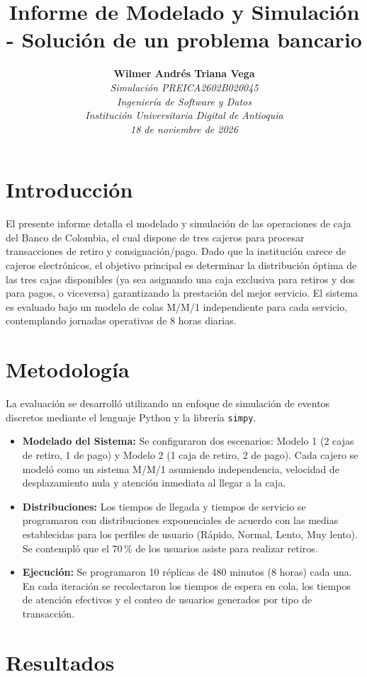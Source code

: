 \documentclass[12pt, a4paper]{article}
\title{\textbf{Informe de Modelado y Simulación - Solución de un problema bancario}}
\author{
\textbf{Wilmer Andrés Triana Vega} \\
\textit{Simulación PREICA2602B020045} \\
\textit{Ingeniería de Software y Datos} \\
\textit{Institución Universitaria Digital de Antioquia} \\
\textit{18 de noviembre de 2026}
}
\date{}
\begin{document}
\maketitle

\section{Introducción}
El presente informe detalla el modelado y simulación de las operaciones de caja del Banco de Colombia, el cual dispone de tres cajeros para procesar transacciones de retiro y consignación/pago. Dado que la institución carece de cajeros electrónicos, el objetivo principal es determinar la distribución óptima de las tres cajas disponibles (ya sea asignando una caja exclusiva para retiros y dos para pagos, o viceversa) garantizando la prestación del mejor servicio. El sistema es evaluado bajo un modelo de colas M/M/1 independiente para cada servicio, contemplando jornadas operativas de 8 horas diarias.

\section{Metodología}
La evaluación se desarrolló utilizando un enfoque de simulación de eventos discretos mediante el lenguaje Python y la librería \texttt{simpy}.

\begin{itemize}
    \item \textbf{Modelado del Sistema:} Se configuraron dos escenarios: Modelo 1 (2 cajas de retiro, 1 de pago) y Modelo 2 (1 caja de retiro, 2 de pago). Cada cajero se modeló como un sistema M/M/1 asumiendo independencia, velocidad de desplazamiento nula y atención inmediata al llegar a la caja.
    \item \textbf{Distribuciones:} Los tiempos de llegada y tiempos de servicio se programaron con distribuciones exponenciales de acuerdo con las medias establecidas para los perfiles de usuario (Rápido, Normal, Lento, Muy lento). Se contempló que el 70\,\% de los usuarios asiste para realizar retiros.
    \item \textbf{Ejecución:} Se programaron 10 réplicas de 480 minutos (8 horas) cada una. En cada iteración se recolectaron los tiempos de espera en cola, los tiempos de atención efectivos y el conteo de usuarios generados por tipo de transacción.
\end{itemize}

\section{Resultados}
\end{document}

